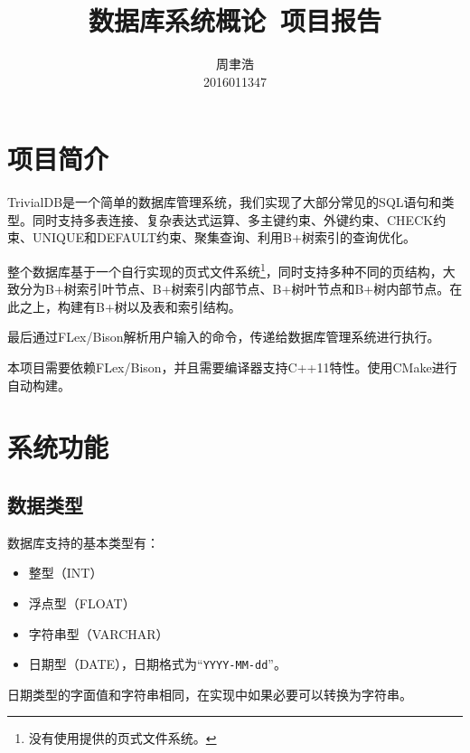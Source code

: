 \documentclass[10pt]{article}
\title{数据库系统概论\ 项目报告}
\author{周聿浩\\ \small{2016011347}}
\begin{document}
\maketitle
\tableofcontents
\clearpage
\section{项目简介}
TrivialDB是一个简单的数据库管理系统，我们实现了大部分常见的SQL语句和类型。同时支持多表连接、复杂表达式运算、多主键约束、外键约束、CHECK约束、UNIQUE和DEFAULT约束、聚集查询、利用B+树索引的查询优化。

整个数据库基于一个自行实现的页式文件系统\footnote{没有使用提供的页式文件系统。}，同时支持多种不同的页结构，大致分为B+树索引叶节点、B+树索引内部节点、B+树叶节点和B+树内部节点。在此之上，构建有B+树以及表和索引结构。

最后通过FLex/Bison解析用户输入的命令，传递给数据库管理系统进行执行。

本项目需要依赖FLex/Bison，并且需要编译器支持C++11特性。使用CMake进行自动构建。
\section{系统功能}
\subsection{数据类型}
数据库支持的基本类型有：
\begin{itemize}
	\item 整型（INT）
	\item 浮点型（FLOAT）
	\item 字符串型（VARCHAR）
	\item 日期型（DATE），日期格式为``\texttt{YYYY-MM-dd}''。
\end{itemize}
日期类型的字面值和字符串相同，在实现中如果必要可以转换为字符串。
\end{document}
